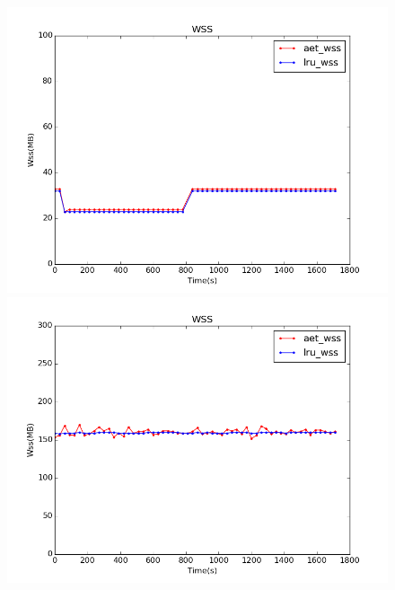 \documentclass[10pt,twocolumn]{article}
\begin{document}
\begin{figure}[!htbp]
{\begin{minipage}[b]{0.2\textwidth}
			\includegraphics[width=1\textwidth]{img/aet_lru_cmp/aet_lru_cmp_lib.png} \\
			\includegraphics[width=1\textwidth]{img/aet_lru_cmp/aet_lru_cmp_sjeng.png} \\
		\end{minipage}
	}
\end{figure}

\end{document}
